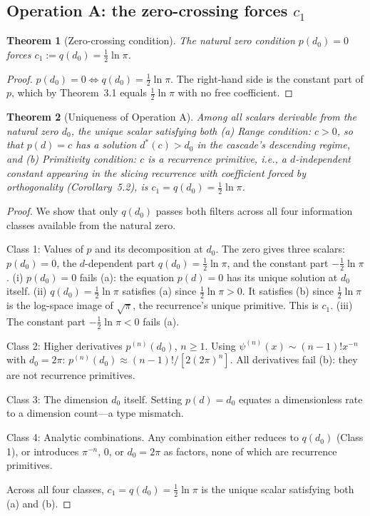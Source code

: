 \documentclass[11pt,a4paper]{article}
\newtheorem{theorem}{Theorem}[section]
\begin{document}
\subsection{Operation A: the zero-crossing forces $c_1$}

\begin{theorem}[Zero-crossing condition]
The natural zero condition $p(d_0) = 0$ forces $c_1 := q(d_0) = \frac{1}{2}\ln\pi$.
\end{theorem}

\begin{proof}
$p(d_0) = 0 \Leftrightarrow q(d_0) = \frac{1}{2}\ln\pi$. The right-hand side is the constant part of $p$, which by Theorem~3.1 equals $\frac{1}{2}\ln\pi$ with no free coefficient.
\end{proof}

\begin{theorem}[Uniqueness of Operation A]
Among all scalars derivable from the natural zero $d_0$, the unique scalar satisfying both (a) Range condition: $c>0$, so that $p(d) = c$ has a solution $d^*(c) > d_0$ in the cascade's descending regime, and (b) Primitivity condition: $c$ is a recurrence primitive, i.e., a $d$-independent constant appearing in the slicing recurrence with coefficient forced by orthogonality (Corollary~5.2), is $c_1 = q(d_0) = \frac{1}{2}\ln\pi$.
\end{theorem}

\begin{proof}
We show that only $q(d_0)$ passes both filters across all four information classes available from the natural zero.

Class 1: Values of $p$ and its decomposition at $d_0$. The zero gives three scalars: $p(d_0) = 0$, the $d$-dependent part $q(d_0) = \frac{1}{2}\ln\pi$, and the constant part $-\frac{1}{2}\ln\pi$. (i) $p(d_0) = 0$ fails (a): the equation $p(d) = 0$ has its unique solution at $d_0$ itself. (ii) $q(d_0) = \frac{1}{2}\ln\pi$ satisfies (a) since $\frac{1}{2}\ln\pi > 0$. It satisfies (b) since $\frac{1}{2}\ln\pi$ is the log-space image of $\sqrt{\pi}$, the recurrence's unique primitive. This is $c_1$. (iii) The constant part $-\frac{1}{2}\ln\pi < 0$ fails (a).

Class 2: Higher derivatives $p^{(n)}(d_0)$, $n\geq 1$. Using $\psi^{(n)}(x)\sim(n-1)!x^{-n}$ with $d_0 = 2\pi$: $p^{(n)}(d_0)\approx(n-1)!/[2(2\pi)^n]$. All derivatives fail (b): they are not recurrence primitives.

Class 3: The dimension $d_0$ itself. Setting $p(d) = d_0$ equates a dimensionless rate to a dimension count---a type mismatch.

Class 4: Analytic combinations. Any combination either reduces to $q(d_0)$ (Class 1), or introduces $\pi^{-n}$, $0$, or $d_0 = 2\pi$ as factors, none of which are recurrence primitives.

Across all four classes, $c_1 = q(d_0) = \frac{1}{2}\ln\pi$ is the unique scalar satisfying both (a) and (b).
\end{proof}
\end{document}
